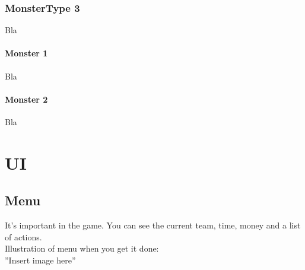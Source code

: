 \documentclass[a4paper,12pt]{book}
\begin{document}
\subsection{MonsterType 3}
Bla
\subsubsection{Monster 1}
Bla
\subsubsection{Monster 2}
Bla
\chapter{UI}
\section{Menu}
It's important in the game. You can see the current team, time, money and a list of actions. \\ Illustration of menu when you get it done: \\ ''Insert image here''
\end{document}
